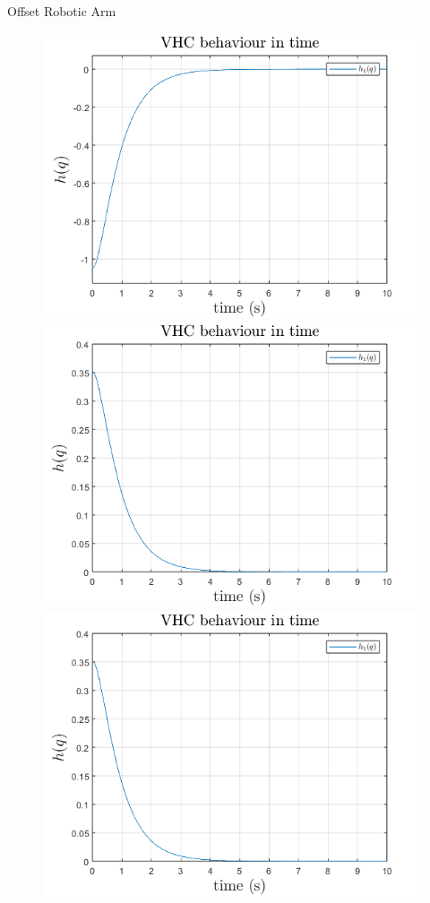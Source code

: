 \documentclass[xcolor=dvipsnames]{beamer}
\begin{document}
\begin{frame}{Offset Robotic Arm}
\begin{figure}[h]
    \centering
    \includegraphics[width=0.48\textheight]{assets/rao1.png}
    \includegraphics[width=0.48\textheight]{assets/rao3.png}
    \includegraphics[width=0.48\textheight]{assets/rao4.png}

\end{figure}
\end{frame}
\end{document}
